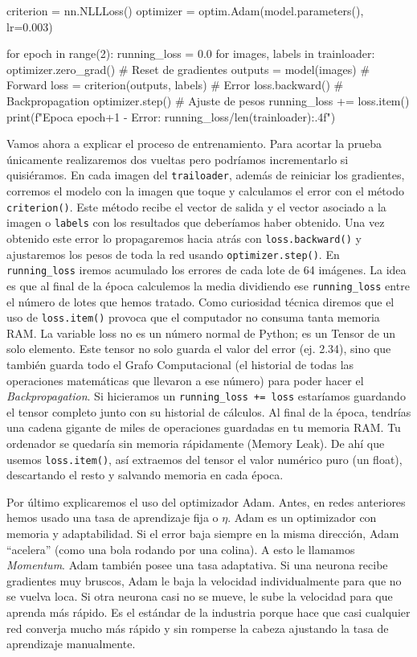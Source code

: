 \documentclass[a4paper,11pt]{article}
\begin{document}
\begin{codigo}
criterion = nn.NLLLoss()
optimizer = optim.Adam(model.parameters(), lr=0.003)

for epoch in range(2):
    running_loss = 0.0
    for images, labels in trainloader:
        optimizer.zero_grad()             # Reset de gradientes
        outputs = model(images)           # Forward
        loss = criterion(outputs, labels) # Error
        loss.backward()                   # Backpropagation
        optimizer.step()                  # Ajuste de pesos
        running_loss += loss.item()
    print(f"Epoca {epoch+1} - Error: {running_loss/len(trainloader):.4f}")
\end{codigo}

Vamos ahora a explicar el proceso de entrenamiento. Para acortar la
prueba únicamente realizaremos dos vueltas pero podríamos incrementarlo
si quisiéramos. En cada imagen del \texttt{trailoader}, además de
reiniciar los gradientes, corremos el modelo con la imagen que toque y
calculamos el error con el método \texttt{criterion()}. Este método
recibe el vector de salida y el vector asociado a la imagen o
\texttt{labels} con los resultados que deberíamos haber obtenido. Una
vez obtenido este error lo propagaremos hacia atrás con
\texttt{loss.backward()} y ajustaremos los pesos de toda la red usando
\texttt{optimizer.step()}. En \texttt{running\_loss} iremos acumulado
los errores de cada lote de 64 imágenes. La idea es que al final de la
época calculemos la media dividiendo ese \texttt{running\_loss} entre el
número de lotes que hemos tratado. Como curiosidad técnica diremos que
el uso de \texttt{loss.item()} provoca que el computador no consuma
tanta memoria RAM. La variable loss no es un número normal de Python; es
un Tensor de un solo elemento. Este tensor no solo guarda el valor del
error (ej. 2.34), sino que también guarda todo el Grafo Computacional
(el historial de todas las operaciones matemáticas que llevaron a ese
número) para poder hacer el \emph{Backpropagation}. Si hicieramos un
\texttt{running\_loss\ +=\ loss} estaríamos guardando el tensor completo
junto con su historial de cálculos. Al final de la época, tendrías una
cadena gigante de miles de operaciones guardadas en tu memoria RAM. Tu
ordenador se quedaría sin memoria rápidamente (Memory Leak). De ahí que
usemos \texttt{loss.item()}, así extraemos del tensor el valor numérico
puro (un float), descartando el resto y salvando memoria en cada época.

Por último explicaremos el uso del optimizador Adam. Antes, en redes
anteriores hemos usado una tasa de aprendizaje fija o \(\eta\). Adam es
un optimizador con memoria y adaptabilidad. Si el error baja siempre en
la misma dirección, Adam ``acelera'' (como una bola rodando por una
colina). A esto le llamamos \emph{Momentum}. Adam también posee una tasa
adaptativa. Si una neurona recibe gradientes muy bruscos, Adam le baja
la velocidad individualmente para que no se vuelva loca. Si otra neurona
casi no se mueve, le sube la velocidad para que aprenda más rápido. Es
el estándar de la industria porque hace que casi cualquier red converja
mucho más rápido y sin romperse la cabeza ajustando la tasa de
aprendizaje manualmente.
\end{document}
